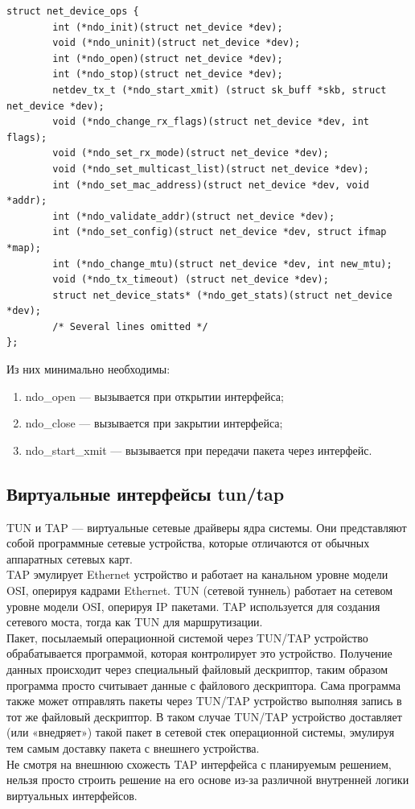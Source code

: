 \documentclass[14pt, a4paper]{extarticle}
\begin{document}
\begin{lstlisting}[caption=net\_device\_ops]
struct net_device_ops {
        int (*ndo_init)(struct net_device *dev);
        void (*ndo_uninit)(struct net_device *dev);
        int (*ndo_open)(struct net_device *dev);
        int (*ndo_stop)(struct net_device *dev);
        netdev_tx_t (*ndo_start_xmit) (struct sk_buff *skb, struct net_device *dev);
        void (*ndo_change_rx_flags)(struct net_device *dev, int flags);
        void (*ndo_set_rx_mode)(struct net_device *dev);
        void (*ndo_set_multicast_list)(struct net_device *dev);
        int (*ndo_set_mac_address)(struct net_device *dev, void *addr);
        int (*ndo_validate_addr)(struct net_device *dev);
        int (*ndo_set_config)(struct net_device *dev, struct ifmap *map);
        int (*ndo_change_mtu)(struct net_device *dev, int new_mtu);
        void (*ndo_tx_timeout) (struct net_device *dev);
        struct net_device_stats* (*ndo_get_stats)(struct net_device *dev);
        /* Several lines omitted */
};
\end{lstlisting}
Из них минимально необходимы:
\begin{enumerate}
	\item ndo\_open --- вызывается при открытии интерфейса;
	\item ndo\_close --- вызывается при закрытии интерфейса;
	\item ndo\_start\_xmit --- вызывается при передачи пакета через интерфейс.
\end{enumerate}




\subsection{Виртуальные интерфейсы tun/tap}
TUN и TAP — виртуальные сетевые драйверы ядра системы. Они представляют собой программные сетевые устройства, которые отличаются от обычных аппаратных сетевых карт. \\
\indent TAP эмулирует Ethernet устройство и работает на канальном уровне модели OSI, оперируя кадрами Ethernet. TUN (сетевой туннель) работает на сетевом уровне модели OSI, оперируя IP пакетами. TAP используется для создания сетевого моста, тогда как TUN для маршрутизации. \\
\indent Пакет, посылаемый операционной системой через TUN/TAP устройство обрабатывается программой, которая контролирует это устройство. Получение данных происходит через специальный файловый дескриптор, таким образом программа просто считывает данные с файлового дескриптора. Сама программа также может отправлять пакеты через TUN/TAP устройство выполняя запись в тот же файловый дескриптор. В таком случае TUN/TAP устройство доставляет (или «внедряет») такой пакет в сетевой стек операционной системы, эмулируя тем самым доставку пакета с внешнего устройства. \\
\indent Не смотря на внешнюю схожесть TAP интерфейса с планируемым решением, нельзя просто строить решение на его основе из-за различной внутренней логики виртуальных интерфейсов.
\end{document}
